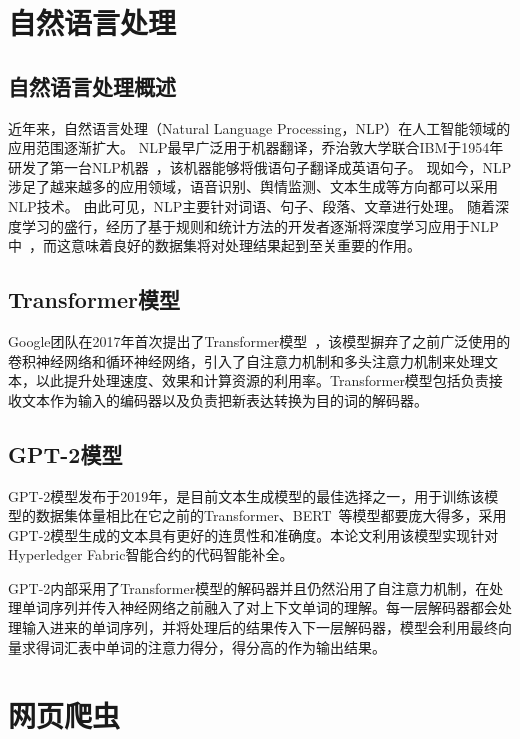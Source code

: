 \section{自然语言处理}

\subsection{自然语言处理概述}

近年来，自然语言处理（Natural Language Processing，NLP）在人工智能领域的应用范围逐渐扩大。
NLP最早广泛用于机器翻译，乔治敦大学联合IBM于1954年研发了第一台NLP机器~\cite{DBLP:conf/icdm/AbeT10}，该机器能够将俄语句子翻译成英语句子。
现如今，NLP涉足了越来越多的应用领域，语音识别、舆情监测、文本生成等方向都可以采用NLP技术。
由此可见，NLP主要针对词语、句子、段落、文章进行处理。
随着深度学习的盛行，经历了基于规则和统计方法的开发者逐渐将深度学习应用于NLP中~\cite{DBLP:conf/nips/SutskeverVL14}，而这意味着良好的数据集将对处理结果起到至关重要的作用。

\subsection{Transformer模型}

Google团队在2017年首次提出了Transformer模型~\cite{DBLP:conf/nips/VaswaniSPUJGKP17}，该模型摒弃了之前广泛使用的卷积神经网络和循环神经网络，引入了自注意力机制和多头注意力机制来处理文本，以此提升处理速度、效果和计算资源的利用率。Transformer模型包括负责接收文本作为输入的编码器以及负责把新表达转换为目的词的解码器。

\subsection{GPT-2模型}

GPT-2模型发布于2019年，是目前文本生成模型的最佳选择之一，用于训练该模型的数据集体量相比在它之前的Transformer、BERT~\cite{DBLP:conf/naacl/DevlinCLT19}等模型都要庞大得多，采用GPT-2模型生成的文本具有更好的连贯性和准确度。本论文利用该模型实现针对Hyperledger Fabric智能合约的代码智能补全。

GPT-2内部采用了Transformer模型的解码器并且仍然沿用了自注意力机制，在处理单词序列并传入神经网络之前融入了对上下文单词的理解。每一层解码器都会处理输入进来的单词序列，并将处理后的结果传入下一层解码器，模型会利用最终向量求得词汇表中单词的注意力得分，得分高的作为输出结果。

\section{网页爬虫}

